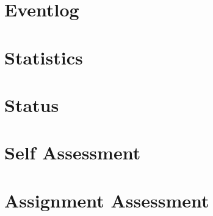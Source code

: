 \documentclass[12pt]{article}
\begin{document}

\tableofcontents

\section{Eventlog}



\section{Statistics}



\section{Status}



\section{Self Assessment}



\section{Assignment Assessment}



\end{document}
